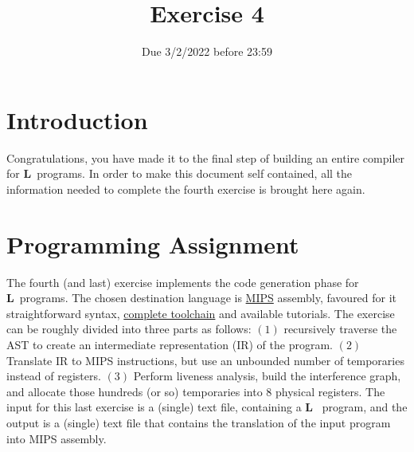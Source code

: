 \documentclass{article}
\begin{document}
\title{Exercise 4}


\date{Due 3/2/2022 before 23:59}

\maketitle

\newcommand{\plname}{\textbf{L}\ }

\section{Introduction}
Congratulations, you have made it to the final step of
building an entire compiler for \plname programs.
In order to make this document self contained,
all the information needed to complete the fourth exercise is brought here again.

\section{Programming Assignment}
The fourth (and last) exercise implements the code generation phase for \plname programs.
The chosen destination language is \href{https://en.wikipedia.org/wiki/MIPS_architecture}{MIPS}
assembly, favoured for it straightforward syntax,
\href{https://en.wikipedia.org/wiki/SPIM}{complete toolchain}
and available tutorials.
The exercise can be roughly divided into three parts as follows:
$(1)$ recursively traverse the AST to create
an intermediate representation (IR) of the program.
$(2)$ Translate IR to MIPS instructions,
but use an unbounded number of temporaries instead of registers.
$(3)$ Perform liveness analysis, build the interference graph,
and allocate those hundreds (or so) temporaries into $8$ physical registers.
The input for this last exercise is a (single) text file, containing a \plname
program, and the output is a (single) text file that contains the translation
of the input program into MIPS assembly.
\end{document}
